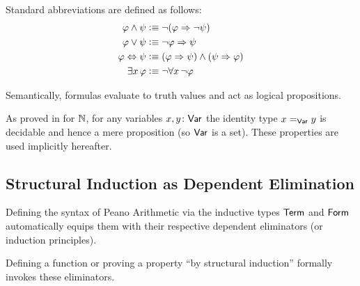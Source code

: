 \begin{defn}[Syntax]
\begin{enumerate}[a),font=\upshape]
        Standard abbreviations are defined as follows:
        \[
            \begin{aligned}
                \varphi\land\psi 
                    &\mathrel{\vcentcolon}\equiv 
                        \neg(\varphi\mathrel{\Rightarrow}\neg\psi) \\
                \varphi\lor\psi 
                    &\mathrel{\vcentcolon}\equiv 
                        \neg\varphi\mathrel{\Rightarrow}\psi \\
                \varphi\Leftrightarrow\psi 
                    &\mathrel{\vcentcolon}\equiv 
                        (\varphi\mathrel{\Rightarrow}\psi) \land (\psi \mathrel{\Rightarrow} \varphi) \\
                \exists x\,\varphi 
                    &\mathrel{\vcentcolon}\equiv 
                        \neg\forall x\,\neg\varphi
            \end{aligned}
        \]
    \end{enumerate}
\end{defn}

\begin{rem}
    Semantically, formulas evaluate to truth values and act as logical propositions.
\end{rem}

\begin{rem}\label{rem:Var-equality-facts}
    As proved in \citep{caniglia2025hott} for $\mathbb{N}$, for any variables $x,y\colon\fun{Var}$ the identity type $x\mathrel{=_{\mathsf{Var}}}y$ is decidable and hence a mere proposition (so $\mathsf{Var}$ is a set). These properties are used implicitly hereafter.
\end{rem}

\subsection{Structural Induction as Dependent Elimination}

Defining the syntax of Peano Arithmetic via the inductive types $\mathsf{Term}$ and $\mathsf{Form}$ automatically equips them with their respective dependent eliminators (or induction principles).

Defining a function or proving a property ``by structural induction'' formally invokes these eliminators.

